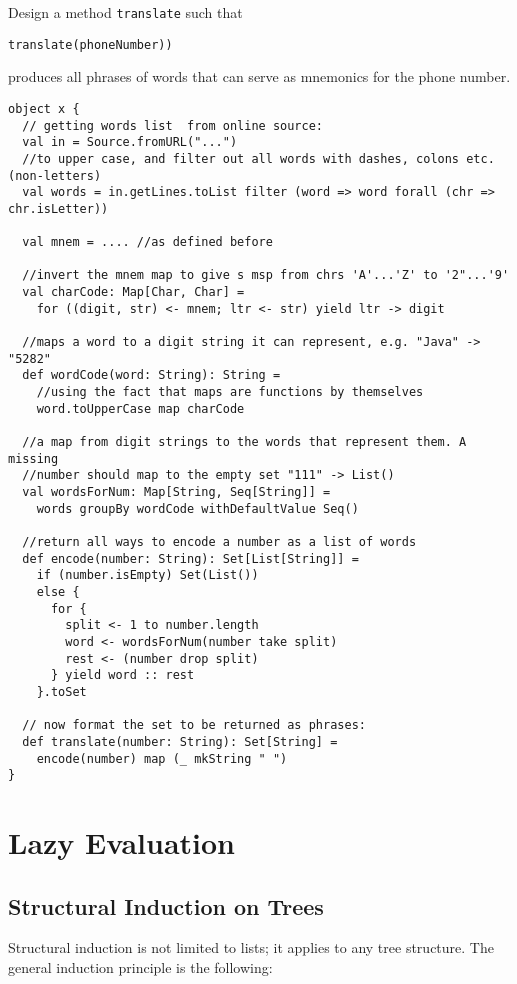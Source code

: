 \documentclass{scrartcl}
\begin{document}
Design a method \lstinline|translate| such that
\begin{lstlisting}
translate(phoneNumber))
\end{lstlisting}
produces all phrases of words that can serve as mnemonics for the phone number. 

\begin{lstlisting}
object x {
  // getting words list  from online source:
  val in = Source.fromURL("...")
  //to upper case, and filter out all words with dashes, colons etc. (non-letters)
  val words = in.getLines.toList filter (word => word forall (chr => chr.isLetter)) 

  val mnem = .... //as defined before

  //invert the mnem map to give s msp from chrs 'A'...'Z' to '2"...'9'
  val charCode: Map[Char, Char] = 
    for ((digit, str) <- mnem; ltr <- str) yield ltr -> digit

  //maps a word to a digit string it can represent, e.g. "Java" -> "5282"
  def wordCode(word: String): String = 
    //using the fact that maps are functions by themselves
    word.toUpperCase map charCode

  //a map from digit strings to the words that represent them. A missing
  //number should map to the empty set "111" -> List()
  val wordsForNum: Map[String, Seq[String]] = 
    words groupBy wordCode withDefaultValue Seq()

  //return all ways to encode a number as a list of words
  def encode(number: String): Set[List[String]] = 
    if (number.isEmpty) Set(List())
    else {
      for {
        split <- 1 to number.length
        word <- wordsForNum(number take split)
        rest <- (number drop split)
      } yield word :: rest
    }.toSet

  // now format the set to be returned as phrases:
  def translate(number: String): Set[String] = 
    encode(number) map (_ mkString " ")
}
\end{lstlisting}

\section{Lazy Evaluation}
\label{sec:LazyEvaluation}
\subsection{Structural Induction on Trees}
\label{sec:StructuralInduction}
Structural induction is not limited to lists; it applies to any tree structure.
The general induction principle is the following:
\end{document}
